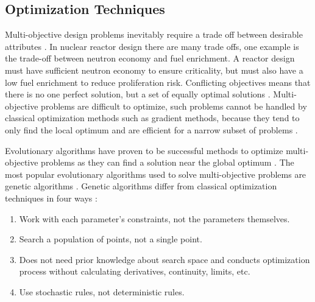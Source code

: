 \subsection{Optimization Techniques}
Multi-objective design problems inevitably require a trade off between 
desirable attributes \cite{byrne_evolving_2014,simon_sciences_2019}. 
In nuclear reactor design there are many trade offs, one example is the 
trade-off between neutron economy and fuel enrichment. 
A reactor design must have sufficient neutron economy to ensure criticality, 
but must also have a low fuel enrichment to reduce proliferation risk.
Conflicting objectives means that there is no one perfect solution, but a set
of equally optimal solutions \cite{byrne_evolving_2014}.
Multi-objective problems are difficult to optimize, such problems 
cannot be handled by classical optimization methods such as gradient 
methods, because they tend to only find the local optimum 
\cite{renner_genetic_2003} and are efficient for a narrow subset 
of problems \cite{zames_genetic_1981}. 

Evolutionary algorithms have proven to be successful 
methods to optimize multi-objective problems \cite{krish_practical_2011} as 
they can find a solution near the global optimum \cite{renner_genetic_2003}. 
The most popular evolutionary algorithms used to solve multi-objective 
problems are genetic algorithms 
\cite{byrne_evolving_2014, krish_practical_2011}. 
Genetic algorithms differ from classical optimization techniques in four ways 
\cite{zames_genetic_1981, pereira_genetic_2000}: 
\begin{enumerate}
        \item Work with each parameter's constraints, not
        the parameters themselves. 
        \item Search a population of points, not a single point. 
        \item Does not need prior knowledge about search space and conducts
        optimization process without calculating derivatives, continuity, 
        limits, etc. 
        \item Use stochastic rules, not deterministic rules. 
\end{enumerate}

